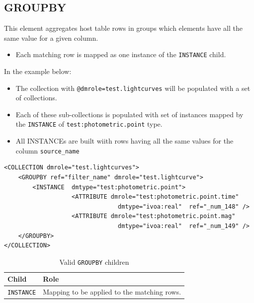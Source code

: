 \documentclass[11pt,a4paper]{ivoa}
\begin{document}
%
%

\subsection{GROUPBY}
This element aggregates host table rows  in groups which elements have all the same value for a given column.

\begin{itemize}
    \item Each matching row  is mapped as one instance of the \texttt{INSTANCE} child.
\end{itemize}

In the example below:

\begin{itemize}
    \item The collection with \texttt{@dmrole=test.lightcurves} will be populated with a set of collections.
    \item Each of these sub-collections is populated with set of instances mapped by the \texttt{INSTANCE} of \texttt{test:photometric.point} type.
    \item All INSTANCEs are built wiith rows having all the same values for the column \texttt{source\_name}
\end{itemize}

\begin{lstlisting}[caption={GROUPBY examples},style=XML]
<COLLECTION dmrole="test.lightcurves">
    <GROUPBY ref="filter_name" dmrole="test.lightcurve">
        <INSTANCE  dmtype="test:photometric.point">
                   <ATTRIBUTE dmrole="test:photometric.point.time" 
                                dmtype="ivoa:real"  ref="_num_148" />
                   <ATTRIBUTE dmrole="test:photometric.point.mag" 
                                dmtype="ivoa:real"  ref="_num_149" />
    </GROUPBY>
</COLLECTION>
\end{lstlisting}

\begin{table}[hbtp]
\small
\centering
\begin{tabulary}{\linewidth}{|L|J|}
\hline
    \textbf{Child} &
    \textbf{Role} \\
\hline \hline
     \texttt{INSTANCE}    &
     Mapping to be applied to the matching rows.  \\       
\hline
\end{tabulary}
     \caption{Valid  \texttt{GROUPBY} children} 
     \label{tbl:group-children}
\end{table}
\end{document}
